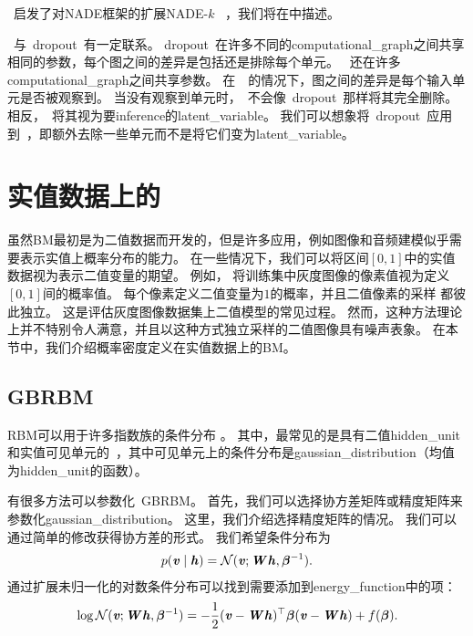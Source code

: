 ~启发了对NADE框架的扩展NADE-$k$~\citep{Raiko-et-al-2014} ，我们将在中描述。

~与~\gls{dropout}~有一定联系。
\gls{dropout}~在许多不同的\gls{computational_graph}之间共享相同的参数，每个图之间的差异是包括还是排除每个单元。
~还在许多\gls{computational_graph}之间共享参数。
在~~的情况下，图之间的差异是每个输入单元是否被观察到。
当没有观察到单元时，~不会像~\gls{dropout}~那样将其完全删除。
相反，~将其视为要\gls{inference}的\gls{latent_variable}。
我们可以想象将~\gls{dropout}~应用到~，即额外去除一些单元而不是将它们变为\gls{latent_variable}。

\section{实值数据上的}
\label{sec:boltzmann_machines_for_real_valued_data}
虽然\gls{BM}最初是为二值数据而开发的，但是许多应用，例如图像和音频建模似乎需要表示实值上概率分布的能力。
在一些情况下，我们可以将区间$[0,1]$中的实值数据视为表示二值变量的期望。
例如， \citet{Hinton-PoE-2000}将训练集中灰度图像的像素值视为定义$[0,1]$间的概率值。
每个像素定义二值变量为$1$的概率，并且二值像素的采样
都彼此独立。
这是评估灰度图像数据集上二值模型的常见过程。
然而，这种方法理论上并不特别令人满意，并且以这种方式独立采样的二值图像具有噪声表象。
在本节中，我们介绍概率密度定义在实值数据上的\gls{BM}。


\subsection{\gls{GBRBM}}
\label{sec:gaussian_bernoulli_rbms}
\gls{RBM}可以用于许多指数族的条件分布 \citep{Welling05}。
其中，最常见的是具有二值\gls{hidden_unit}和实值可见单元的~，其中可见单元上的条件分布是\gls{gaussian_distribution}（均值为\gls{hidden_unit}的函数）。

有很多方法可以参数化~\gls{GBRBM}。
首先，我们可以选择协方差矩阵或精度矩阵来参数化\gls{gaussian_distribution}。
这里，我们介绍选择精度矩阵的情况。
我们可以通过简单的修改获得协方差的形式。
我们希望条件分布为
\begin{align}
 p(\boldsymbol{\mathit{v}}  \mid  \boldsymbol{\mathit{h}}) = \mathcal{N}(\boldsymbol{\mathit{v}}; \boldsymbol{\mathit{W}}\boldsymbol{\mathit{h}}, \boldsymbol{\beta}^{-1}).
\end{align}
通过扩展未归一化的对数条件分布可以找到需要添加到\gls{energy_function}中的项：
\begin{align} \label{eq:2039log}
 \log \mathcal{N}(\boldsymbol{\mathit{v}}; \boldsymbol{\mathit{W}}\boldsymbol{\mathit{h}}, \boldsymbol{\beta}^{-1}) = -\frac{1}{2}(\boldsymbol{\mathit{v}} - \boldsymbol{\mathit{W}}\boldsymbol{\mathit{h}})^\top \boldsymbol{\beta} (\boldsymbol{\mathit{v}} - \boldsymbol{\mathit{W}}\boldsymbol{\mathit{h}}) + 
 f(\boldsymbol{\beta}) .
\end{align}

